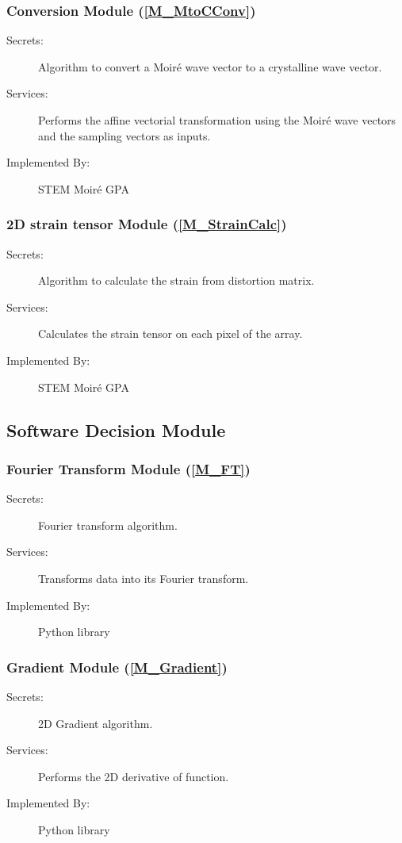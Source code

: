 \documentclass[12pt, titlepage]{article}
\newcommand{\progname}{STEM Moir{\'e} GPA}
\begin{document}
\subsubsection{Conversion Module (\texorpdfstring{\cref{M_MtoCConv}}))}
\label{MG_MtoCConv}
\begin{description}
\item[Secrets:] Algorithm to convert a Moir{\'e} wave vector to a crystalline 
wave vector.
\item[Services:] Performs the affine vectorial transformation using the 
Moir{\'e} wave vectors and the sampling vectors as inputs.
\item[Implemented By:] \progname{}
\end{description}

\subsubsection{2D strain tensor Module (\texorpdfstring{\cref{M_StrainCalc}}))}
\label{MG_StrainCalc}
\begin{description}
\item[Secrets:] Algorithm to calculate the strain from distortion matrix.
\item[Services:] Calculates the strain tensor on each pixel of the array.
\item[Implemented By:] \progname{}
\end{description}

\subsection{Software Decision Module}

\subsubsection{Fourier Transform Module (\texorpdfstring{\cref{M_FT}}))}
\label{MG_FT}
\begin{description}
\item[Secrets:] Fourier transform algorithm.
\item[Services:] Transforms data into its Fourier transform.
\item[Implemented By:]Python library
\end{description}

\subsubsection{Gradient Module (\texorpdfstring{\cref{M_Gradient}}))}
\label{MG_Gradient}
\begin{description}
\item[Secrets:] 2D Gradient algorithm.
\item[Services:] Performs the 2D derivative of function.
\item[Implemented By:]Python library
\end{description}
\end{document}
